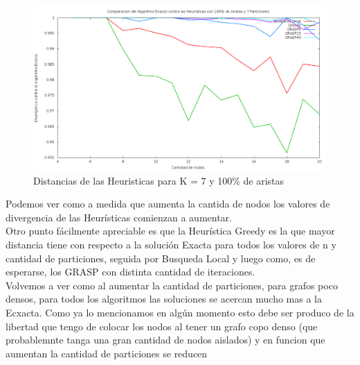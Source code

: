\begin{figure}[H]
\begin{center}
\includegraphics[scale=0.3]{finales/ComparacionesCon7Particiones100Aristas.png}
\caption{Distancias de las Heuristicas para K = 7 y 100\% de aristas}
\end{center}
\end{figure}



Podemos ver como a medida que aumenta la cantida de nodos los valores de divergencia de las Heur\'isticas comienzan a aumentar.\\

Otro punto f\'acilmente apreciable es que la Heur\'istica Greedy es la que mayor distancia tiene con respecto a la soluci\'on Exacta para todos los valores de n y cantidad de particiones, seguida por Busqueda Local y luego como, es de esperarse, los GRASP con distinta cantidad de iteraciones.\\

Volvemos a ver como al aumentar la cantidad de particiones, para grafos poco densos, para todos los algoritmos las soluciones se acercan mucho mas a la Ecxacta. Como ya lo mencionamos en alg\'un momento esto debe ser produco de la libertad que tengo de colocar los nodos al tener un grafo copo denso (que probablemnte tanga una gran cantidad de nodos aislados) y en funcion que aumentan la cantidad de particiones se reducen 
